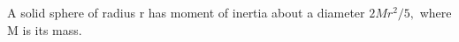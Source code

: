  A solid sphere of radius r has moment of inertia about a diameter $2Mr^{2}/5,$  where M is its mass.
